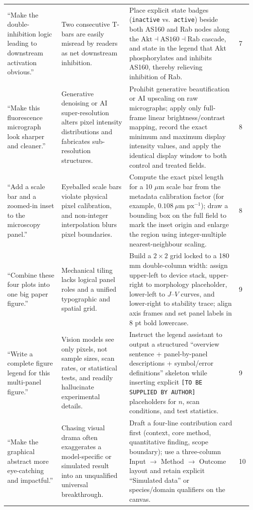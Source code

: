 \begin{longtable}{@{}p{26mm}p{28mm}p{56mm}p{10mm}@{}}
``Make the double-inhibition logic leading to downstream activation obvious.'' & Two consecutive T-bars are easily misread by readers as net downstream inhibition. & Place explicit state badges (\texttt{inactive} vs.\ \texttt{active}) beside both AS160 and Rab nodes along the $\text{Akt} \dashv \text{AS160} \dashv \text{Rab}$ cascade, and state in the legend that Akt phosphorylates and inhibits AS160, thereby relieving inhibition of Rab. & 7 \\
``Make this fluorescence micrograph look sharper and cleaner.'' & Generative denoising or AI super-resolution alters pixel intensity distributions and fabricates sub-resolution structures. & Prohibit generative beautification or AI upscaling on raw micrographs; apply only full-frame linear brightness/contrast mapping, record the exact minimum and maximum display intensity values, and apply the identical display window to both control and treated fields. & 8 \\
``Add a scale bar and a zoomed-in inset to the microscopy panel.'' & Eyeballed scale bars violate physical pixel calibration, and non-integer interpolation blurs pixel boundaries. & Compute the exact pixel length for a 10 $\mu$m scale bar from the metadata calibration factor (for example, $0.108\ \mu\text{m px}^{-1}$); draw a bounding box on the full field to mark the inset origin and enlarge the region using integer-multiple nearest-neighbour scaling. & 8 \\
``Combine these four plots into one big paper figure.'' & Mechanical tiling lacks logical panel roles and a unified typographic and spatial grid. & Build a $2\times 2$ grid locked to a 180 mm double-column width: assign upper-left to device stack, upper-right to morphology placeholder, lower-left to $J$--$V$ curves, and lower-right to stability trace; align axis frames and set panel labels in 8 pt bold lowercase. & 9 \\
``Write a complete figure legend for this multi-panel figure.'' & Vision models see only pixels, not sample sizes, scan rates, or statistical tests, and readily hallucinate experimental details. & Instruct the legend assistant to output a structured ``overview sentence + panel-by-panel descriptions + symbol/error definitions'' skeleton while inserting explicit \texttt{[TO BE SUPPLIED BY AUTHOR]} placeholders for $n$, scan conditions, and test statistics. & 9 \\
``Make the graphical abstract more eye-catching and impactful.'' & Chasing visual drama often exaggerates a model-specific or simulated result into an unqualified universal breakthrough. & Draft a four-line contribution card first (context, core method, quantitative finding, scope boundary); use a three-column Input $\rightarrow$ Method $\rightarrow$ Outcome layout and retain explicit ``Simulated data'' or species/domain qualifiers on the canvas. & 10 \\

\end{longtable}
